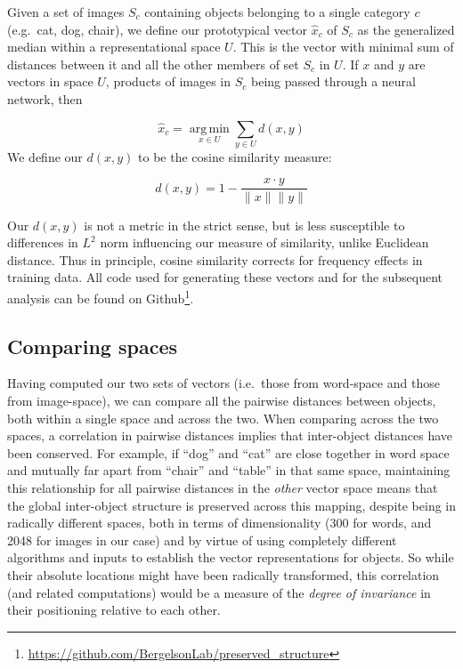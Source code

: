 \documentclass[10pt, letterpaper]{article}
\begin{document}
Given a set of images \(S_c\) containing objects belonging to a single
category \(c\) (e.g.~cat, dog, chair), we define our prototypical vector
\(\hat{x}_c\) of \(S_c\) as the generalized median within a
representational space \(U\). This is the vector with minimal sum of
distances between it and all the other members of set \(S_c\) in \(U\).
If \(x\) and \(y\) are vectors in space \(U\), products of images in
\(S_c\) being passed through a neural network, then

\[
 \hat{x}_c = \operatorname*{arg\,min}_{x\in U} \sum_{y\in U} d(x, y)
\] We define our \(d(x, y)\) to be the cosine similarity measure:

\[
d(x, y) = 1 - \frac{x\cdot y}{\|x\|\|y\|}
\]

Our \(d(x, y)\) is not a metric in the strict sense, but is less
susceptible to differences in \(L^2\) norm influencing our measure of
similarity, unlike Euclidean distance. Thus in principle, cosine
similarity corrects for frequency effects in training data. All code
used for generating these vectors and for the subsequent analysis can be
found on
Github\footnote{\url{https://github.com/BergelsonLab/preserved_structure}}.

\subsection{Comparing spaces}\label{comparing-spaces}

Having computed our two sets of vectors (i.e.~those from word-space and
those from image-space), we can compare all the pairwise distances
between objects, both within a single space and across the two. When
comparing across the two spaces, a correlation in pairwise distances
implies that inter-object distances have been conserved. For example, if
``dog'' and ``cat'' are close together in word space and mutually far
apart from ``chair'' and ``table'' in that same space, maintaining this
relationship for all pairwise distances in the \textit{other} vector
space means that the global inter-object structure is preserved across
this mapping, despite being in radically different spaces, both in terms
of dimensionality (300 for words, and 2048 for images in our case) and
by virtue of using completely different algorithms and inputs to
establish the vector representations for objects. So while their
absolute locations might have been radically transformed, this
correlation (and related computations) would be a measure of the
\textit{degree of invariance} in their positioning relative to each
other.
\end{document}
